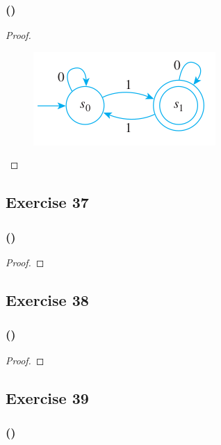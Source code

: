\documentclass[14pt]{extarticle}
\begin{document}
\subsubsection{()}

\begin{proof}
\begin{figure}[ht!]
\centering
\includegraphics[scale=0.5]{../images/12.2.36.png}
\end{figure}
\end{proof}

\subsection{Exercise 37}

\subsubsection{()}

\begin{proof}

\end{proof}

\subsection{Exercise 38}

\subsubsection{()}

\begin{proof}

\end{proof}

\subsection{Exercise 39}

\subsubsection{()}
\end{document}
